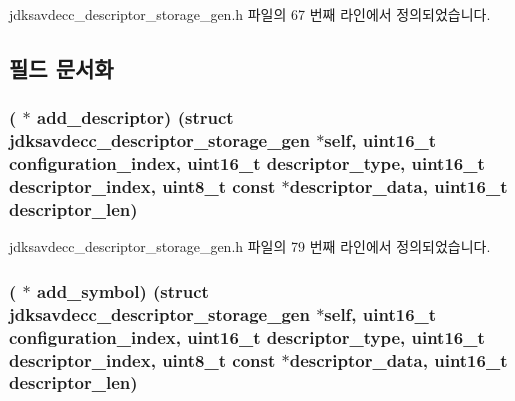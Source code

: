 jdksavdecc\+\_\+descriptor\+\_\+storage\+\_\+gen.\+h 파일의 67 번째 라인에서 정의되었습니다.



\subsection{필드 문서화}
\subsubsection[{\texorpdfstring{add\+\_\+descriptor}{add_descriptor}}]{( $\ast$ add\+\_\+descriptor) (struct {\bf jdksavdecc\+\_\+descriptor\+\_\+storage\+\_\+gen} $\ast$self, uint16\+\_\+t configuration\+\_\+index, uint16\+\_\+t descriptor\+\_\+type, uint16\+\_\+t descriptor\+\_\+index, {\bf uint8\+\_\+t} const $\ast$descriptor\+\_\+data, uint16\+\_\+t descriptor\+\_\+len)}\hypertarget{structjdksavdecc__descriptor__storage__gen_a3f75bfd7b4c1481a09d9433ce13cd623}{}\label{structjdksavdecc__descriptor__storage__gen_a3f75bfd7b4c1481a09d9433ce13cd623}


jdksavdecc\+\_\+descriptor\+\_\+storage\+\_\+gen.\+h 파일의 79 번째 라인에서 정의되었습니다.

\subsubsection[{\texorpdfstring{add\+\_\+symbol}{add_symbol}}]{( $\ast$ add\+\_\+symbol) (struct {\bf jdksavdecc\+\_\+descriptor\+\_\+storage\+\_\+gen} $\ast$self, uint16\+\_\+t configuration\+\_\+index, uint16\+\_\+t descriptor\+\_\+type, uint16\+\_\+t descriptor\+\_\+index, {\bf uint8\+\_\+t} const $\ast$descriptor\+\_\+data, uint16\+\_\+t descriptor\+\_\+len)}\hypertarget{structjdksavdecc__descriptor__storage__gen_a54d2a7579bd9402aa4b55e46ae3c589a}{}\label{structjdksavdecc__descriptor__storage__gen_a54d2a7579bd9402aa4b55e46ae3c589a}


